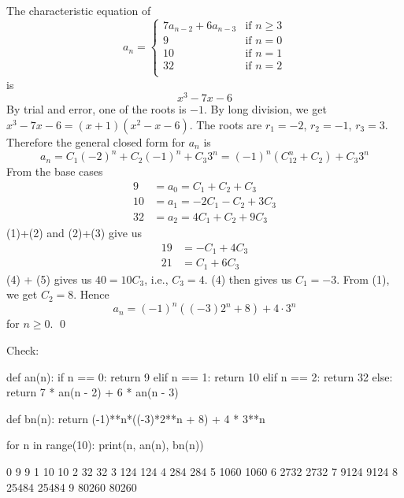 
The characteristic equation of
\[
a_n = 
\begin{cases}
  7a_{n-2} + 6a_{n-3} &\text{if } n \geq 3 \\
  9                 &\text{if } n = 0 \\
  10                &\text{if } n = 1 \\
  32                &\text{if } n = 2 \\
\end{cases}
\]
is
\[
x^3 - 7x - 6
\]
By trial and error, one of the roots is $-1$.
By long division, we get $x^3 - 7x - 6 = (x + 1)(x^2 - x - 6)$.
The roots are $r_1 = -2$, $r_2 = -1$, $r_3 = 3$.
Therefore the general closed form for $a_n$ is
\[
a_n = C_1 (-2)^n + C_2 (-1)^n + C_3 3^n
= (-1)^n(C_12^n + C_2) + C_3 3^n
\]
From the base cases
\begin{align*}
 9 &= a_0 = C_1 + C_2 + C_3 \tag{1}\\
10 &= a_1 = -2C_1 - C_2 + 3C_3 \tag{2} \\
32 &= a_2 = 4C_1 + C_2 + 9C_3 \tag{3}
\end{align*}
(1)+(2) and (2)+(3) give us
\begin{align*}
19 &= -C_1 + 4C_3 \tag{4} \\
21 &= C_1 + 6C_3 \tag{5}
\end{align*}
(4) + (5) gives us $40 = 10C_3$, i.e., $C_3 = 4$.
(4) then gives us $C_1 = -3$.
From (1), we get $C_2 = 8$.
Hence
\[
a_n = (-1)^n((-3)2^n + 8) + 4 \cdot 3^n
\]
for $n \geq 0$.
\qed

Check:
\begin{console}[fontsize=\footnotesize]
def an(n):
    if n == 0: return 9
    elif n == 1: return 10
    elif n == 2: return 32
    else: return 7 * an(n - 2) + 6 * an(n - 3) 

def bn(n):
    return (-1)**n*((-3)*2**n + 8) + 4 * 3**n

for n in range(10):
    print(n, an(n), bn(n))
\end{console}
\begin{console}[fontsize=\footnotesize]
0 9 9
1 10 10
2 32 32
3 124 124
4 284 284
5 1060 1060
6 2732 2732
7 9124 9124
8 25484 25484
9 80260 80260
\end{console}
